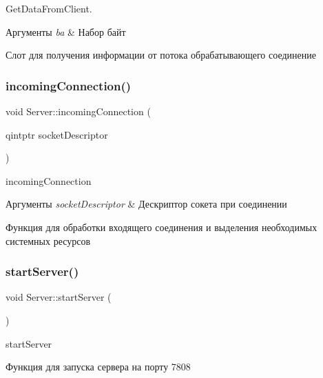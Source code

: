 Get\+Data\+From\+Client. 


\begin{DoxyParams}{Аргументы}
{\em ba} & Набор байт\\
\hline
\end{DoxyParams}
Слот для получения информации от потока обрабатывающего соединение \mbox{\label{classServer_a3952d37b7bc53a4377f411d9ccaa9d62}} 
\subsubsection{\texorpdfstring{incoming\+Connection()}{incomingConnection()}}
{\footnotesize\ttfamily void Server\+::incoming\+Connection (\begin{DoxyParamCaption}\item[{qintptr}]{socket\+Descriptor }\end{DoxyParamCaption})\hspace{0.3cm}{\ttfamily [protected]}}



incoming\+Connection 


\begin{DoxyParams}{Аргументы}
{\em socket\+Descriptor} & Дескриптор сокета при соединении\\
\hline
\end{DoxyParams}
Функция для обработки входящего соединения и выделения необходимых системных ресурсов \mbox{\label{classServer_af59bb3a96b3311ed2b87e2d6899d9f79}} 
\subsubsection{\texorpdfstring{start\+Server()}{startServer()}}
{\footnotesize\ttfamily void Server\+::start\+Server (\begin{DoxyParamCaption}{ }\end{DoxyParamCaption})}



start\+Server 

Функция для запуска сервера на порту 7808 \mbox{\label{classServer_a3fddab101fd0c1b85570209fcad7155c}} 
